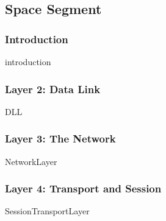 \subsection{Space Segment}

%


\subsubsection{Introduction}
{introduction}

\subsubsection{Layer 2: Data Link}
{DLL}

\subsubsection{Layer 3: The Network}
{NetworkLayer}

\subsubsection{Layer 4: Transport and Session}
{SessionTransportLayer}
